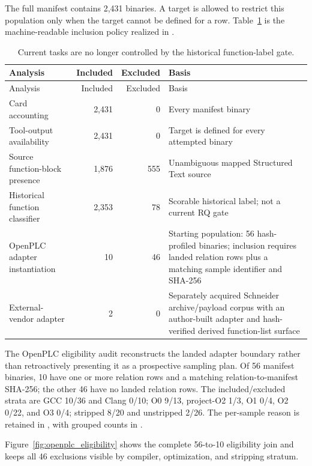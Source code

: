 \documentclass[a4paper,fleqn]{cas-dc}
\begin{document}
The full manifest contains 2{,}431 binaries. A target is allowed to restrict this population only when the target cannot be defined for a row. Table~\ref{tab:population_flow} is the machine-readable inclusion policy realized in .

\begin{longtable}{@{}>{\raggedright\arraybackslash}p{}rr>{\raggedright\arraybackslash}p{}@{}}
\caption{Current tasks are no longer controlled by the historical function-label gate.}
\label{tab:population_flow}\\
\toprule
Analysis & Included & Excluded & Basis \\
\midrule
\endfirsthead
\toprule
Analysis & Included & Excluded & Basis \\
\midrule
\endhead
Card accounting & 2,431 & 0 & Every manifest binary \\
Tool-output availability & 2,431 & 0 & Target is defined for every attempted binary \\
Source function-block presence & 1,876 & 555 & Unambiguous mapped Structured Text source \\
Historical function classifier & 2,353 & 78 & Scorable historical label; not a current RQ gate \\
OpenPLC adapter instantiation & 10 & 46 & Starting population: 56 hash-profiled binaries; inclusion requires landed relation rows plus a matching sample identifier and SHA-256 \\
External-vendor adapter & 2 & 0 & Separately acquired Schneider archive/payload corpus with an author-built adapter and hash-verified derived function-list surface \\
\bottomrule
\end{longtable}

The OpenPLC eligibility audit reconstructs the landed adapter boundary rather than retroactively presenting it as a prospective sampling plan. Of 56 manifest binaries, 10 have one or more relation rows and a matching relation-to-manifest SHA-256; the other 46 have no landed relation rows. The included/excluded strata are GCC 10/36 and Clang 0/10; O0 9/13, project-O2 1/3, O1 0/4, O2 0/22, and O3 0/4; stripped 8/20 and unstripped 2/26. The per-sample reason is retained in , with grouped counts in .

Figure~\ref{fig:openplc_eligibility} shows the complete 56-to-10 eligibility join and keeps all 46 exclusions visible by compiler, optimization, and stripping stratum.
\end{document}

